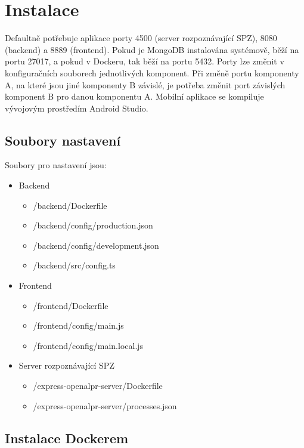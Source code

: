 
\chapter{Instalace}

\noindent
Defaultně potřebuje aplikace porty 4500 (server rozpoznávající SPZ), 8080 (backend) a
8889 (frontend). Pokud je MongoDB instalována systémově, běží na portu 27017, a pokud
v Dockeru, tak běží na portu 5432.
Porty lze změnit v konfiguračních souborech jednotlivých
komponent. Při změně portu komponenty A, na které jsou jiné komponenty B závislé,
je potřeba změnit port závislých komponent B pro danou komponentu A.
Mobilní aplikace se kompiluje vývojovým prostředím Android Studio.

\section{Soubory nastavení}

\noindent
Soubory pro nastavení jsou:

\begin{itemize}
  \setlength\itemsep{-.3em}
  \item Backend
  \begin{itemize}
    \item /backend/Dockerfile
    \item /backend/config/production.json
    \item /backend/config/development.json
    \item /backend/src/config.ts
  \end{itemize}
  \item Frontend
  \begin{itemize}
    \item /frontend/Dockerfile
    \item /frontend/config/main.js
    \item /frontend/config/main.local.js
  \end{itemize}
  \item Server rozpoznávající SPZ
  \begin{itemize}
    \item /express-openalpr-server/Dockerfile
    \item /express-openalpr-server/processes.json
  \end{itemize}
\end{itemize}

\newpage
\section{Instalace Dockerem}

